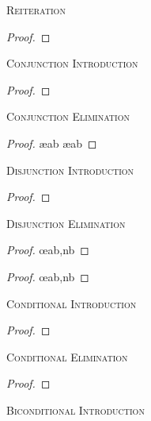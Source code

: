 \label{nd-proofrules}
\textsc{Reiteration}

\begin{proof}
	 
\end{proof}


\textsc{Conjunction Introduction}

\begin{proof}
	 
\end{proof}

\textsc{Conjunction Elimination}

\begin{proof}
	 \ae{ab}
	 \ae{ab}
\end{proof}


\textsc{Disjunction Introduction}

\begin{proof}
\end{proof}

\textsc{Disjunction Elimination}

\begin{proof}
	 \oe{ab,nb}
\end{proof}

\begin{proof}
	 \oe{ab,nb}
\end{proof}


\textsc{Conditional Introduction}

\nopagebreak
\begin{proof}
	\open
		 
	\close
\end{proof}

\pagebreak
\textsc{Conditional Elimination}

\begin{proof}
	 
\end{proof}

\textsc{Biconditional Introduction}

